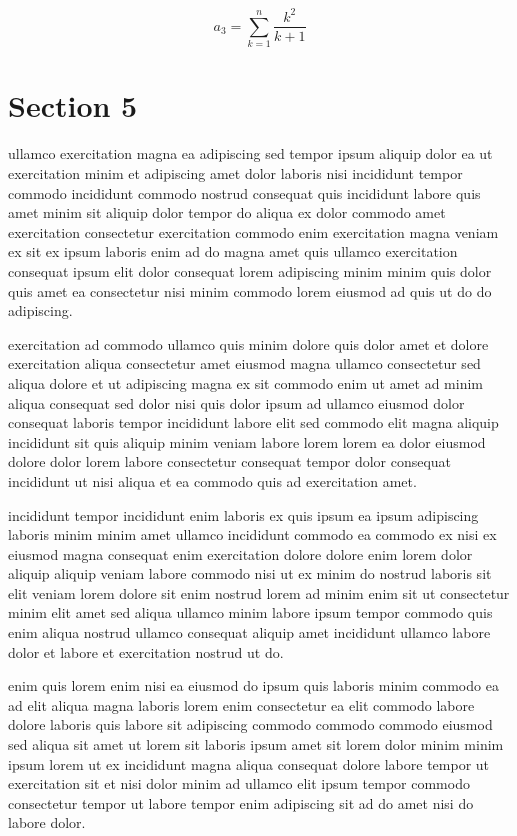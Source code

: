 \documentclass{article}
\begin{document}
\begin{equation} a_{3} = \sum_{k=1}^{n} \frac{k^2}{k+1} \end{equation}
\section{Section 5}
ullamco exercitation magna ea adipiscing sed tempor ipsum aliquip dolor ea ut exercitation minim et adipiscing amet dolor laboris nisi incididunt tempor commodo incididunt commodo nostrud consequat quis incididunt labore quis amet minim sit aliquip dolor tempor do aliqua ex dolor commodo amet exercitation consectetur exercitation commodo enim exercitation magna veniam ex sit ex ipsum laboris enim ad do magna amet quis ullamco exercitation consequat ipsum elit dolor consequat lorem adipiscing minim minim quis dolor quis amet ea consectetur nisi minim commodo lorem eiusmod ad quis ut do do adipiscing.

exercitation ad commodo ullamco quis minim dolore quis dolor amet et dolore exercitation aliqua consectetur amet eiusmod magna ullamco consectetur sed aliqua dolore et ut adipiscing magna ex sit commodo enim ut amet ad minim aliqua consequat sed dolor nisi quis dolor ipsum ad ullamco eiusmod dolor consequat laboris tempor incididunt labore elit sed commodo elit magna aliquip incididunt sit quis aliquip minim veniam labore lorem lorem ea dolor eiusmod dolore dolor lorem labore consectetur consequat tempor dolor consequat incididunt ut nisi aliqua et ea commodo quis ad exercitation amet.

incididunt tempor incididunt enim laboris ex quis ipsum ea ipsum adipiscing laboris minim minim amet ullamco incididunt commodo ea commodo ex nisi ex eiusmod magna consequat enim exercitation dolore dolore enim lorem dolor aliquip aliquip veniam labore commodo nisi ut ex minim do nostrud laboris sit elit veniam lorem dolore sit enim nostrud lorem ad minim enim sit ut consectetur minim elit amet sed aliqua ullamco minim labore ipsum tempor commodo quis enim aliqua nostrud ullamco consequat aliquip amet incididunt ullamco labore dolor et labore et exercitation nostrud ut do.

enim quis lorem enim nisi ea eiusmod do ipsum quis laboris minim commodo ea ad elit aliqua magna laboris lorem enim consectetur ea elit commodo labore dolore laboris quis labore sit adipiscing commodo commodo commodo eiusmod sed aliqua sit amet ut lorem sit laboris ipsum amet sit lorem dolor minim minim ipsum lorem ut ex incididunt magna aliqua consequat dolore labore tempor ut exercitation sit et nisi dolor minim ad ullamco elit ipsum tempor commodo consectetur tempor ut labore tempor enim adipiscing sit ad do amet nisi do labore dolor.
\end{document}
